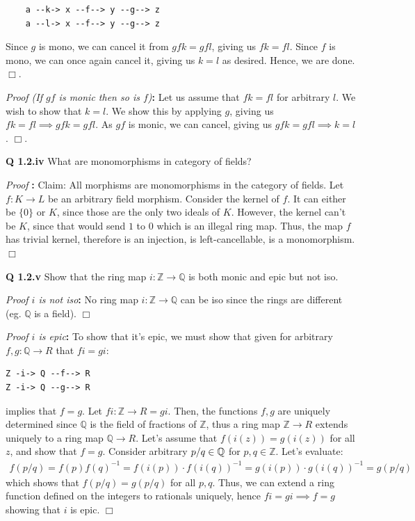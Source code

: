 \documentclass[11pt]{book}
\newcommand{\Z}{\ensuremath{\mathbb{Z}}}
\newcommand{\Q}{\ensuremath{\mathbb{Q}}}
\def\qed{$\Box$}
\newcommand{\beginproof}[1][]{\emph{Proof #1}\textbf{:} }
\newcommand{\question}[1]{\textbf{#1}}
\begin{document}
\begin{verbatim}
    a --k-> x --f--> y --g--> z
    a --l-> x --f--> y --g--> z
\end{verbatim}

Since $g$ is mono, we can cancel it from $gfk = gfl$, giving us $fk = fl$.
Since $f$ is mono, we can once again cancel it, giving us $k = l$ as desired.
Hence, we are done.  \qed.

\beginproof[(If $gf$ is monic then so is $f$)]
Let us assume that $fk = fl$ for arbitrary $l$. We wish to show that $k = l$. We show this
by applying $g$, giving us $fk = fl \implies gfk = gfl$. As $gf$ is monic, we can cancel, giving
us $gfk = gfl \implies k = l$. 
\qed.

\question{Q 1.2.iv} What are monomorphisms in category of fields?

\beginproof Claim: All morphisms are monomorphisms in the category of fields. Let $f: K \rightarrow L$ be an arbitrary field
morphism. Consider the kernel of $f$. It can either be $\{ 0 \}$ or $K$, since those are the only two
ideals of $K$. However, the kernel can't be $K$, since that would send $1$ to $0$ which is an illegal ring map.
Thus, the map $f$ has trivial kernel, therefore is an injection, is left-cancellable, is a monomorphism.\qed


\question{Q 1.2.v} Show that the ring map $i: \mathbb Z \rightarrow \mathbb Q$ is both monic and epic but not iso.

\beginproof[$i$ is not iso]
No ring map $i: \mathbb Z \rightarrow \mathbb Q$ can be iso since the rings are different (eg. $\mathbb Q$ is a field). \qed



\beginproof[$i$ is epic]
To show that it's epic, we must show that given for arbitrary $f, g: \mathbb Q \rightarrow R$ that $fi = gi$:

\begin{verbatim}
Z -i-> Q --f--> R
Z -i-> Q --g--> R
\end{verbatim}

implies that $f = g$. Let $fi: \mathbb Z \rightarrow R = gi$. Then, the functions $f, g$ are uniquely determined
since $\mathbb Q$ is the field of fractions of $\mathbb Z$, thus a ring map $\Z \rightarrow R$ extends uniquely to a ring
map $\Q \rightarrow R$. Let's assume that $f(i(z)) = g(i(z))$ for all $z$, and show that $f = g$.
Consider arbitrary $p/q \in \mathbb \Q$ for $p, q \in \Z$. Let's evaluate:
\begin{align*}
f(p/q) = f(p)f(q)^{-1} = f(i(p)) \cdot f(i(q))^{-1} = g(i(p)) \cdot g(i(q))^{-1} = g(p/q)
\end{align*}
which shows that $f(p/q) = g(p/q)$ for all $p, q$. Thus, we can extend a ring function defined on the integers to rationals uniquely,
hence $fi = gi \implies f = g$ showing that $i$ is epic.
\qed
\end{document}

